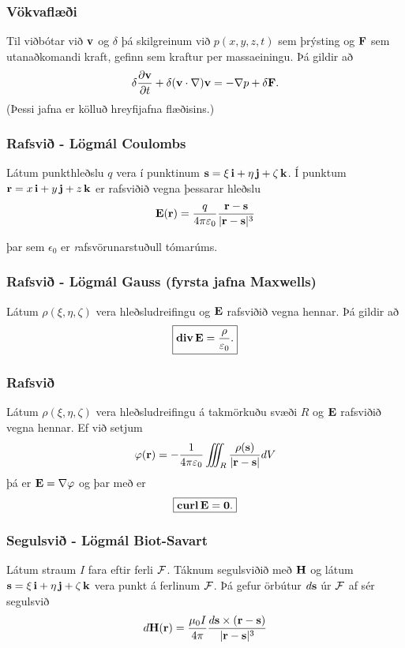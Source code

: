 \subsubsection{Vökvaflæði \rtask{}}
 Til viðbótar við $\mbox{${\bf v}$}$ og $\delta$ þá skilgreinum við $p(x,y,z,t)$ sem þrýsting og $\mbox{${\bf F}$}$ sem utanaðkomandi kraft, gefinn sem kraftur per massaeiningu.  Þá gildir að $$\delta\frac{\partial \mbox{${\bf v}$}}{\partial t}+\delta(\mbox{${\bf v}$}\cdot\nabla)\mbox{${\bf v}$}=-\nabla p+\delta\mbox{${\bf F}$}.$$
(Þessi jafna er kölluð hreyfijafna flæðisins.)


\subsubsection{Rafsvið \rtask{} - Lögmál Coulombs }
 Látum punkthleðslu $q$ vera í punktinum $\mbox{${\bf s}$}=\xi\,\mbox{${\bf i}$}+\eta\,\mbox{${\bf j}$}+\zeta\,\mbox{${\bf k}$}$.   Í punktum $\mbox{${\bf r}$}=x\,\mbox{${\bf i}$}+y\,\mbox{${\bf j}$}+z\,\mbox{${\bf k}$}$ er rafsviðið vegna þessarar hleðslu
$$\mbox{${\bf E}$}(\mbox{${\bf r}$})=\frac{q}{4\pi\varepsilon_0}\frac{\mbox{${\bf r}$}-\mbox{${\bf s}$}}{|\mbox{${\bf r}$}-\mbox{${\bf s}$}|^3}$$

þar sem $\epsilon_0$ er {\emph rafsvörunarstuðull} tómarúms.



\subsubsection{Rafsvið  \rtask{} - Lögmál Gauss (fyrsta jafna Maxwells)}
 Látum $\rho(\xi,\eta,\zeta)$ vera hleðsludreifingu og $\mbox{${\bf E}$}$ rafsviðið vegna hennar.  Þá gildir að 
$$\boxed{\mbox{${\rm\bf div\,}$}\mbox{${\bf E}$}=\frac{\rho}{\varepsilon_0}.}$$

\subsubsection{Rafsvið \rtask{}}
 Látum $\rho(\xi,\eta,\zeta)$ vera hleðsludreifingu á takmörkuðu svæði $R$ og $\mbox{${\bf E}$}$ rafsviðið vegna hennar.  Ef við setjum
 $$ \varphi(\mbox{${\bf r}$}) = -\frac{1}{4 \pi \varepsilon_0} \iiint_R \frac{\rho(\mbox{${\bf s}$})}{|\mbox{${\bf r}$}-\mbox{${\bf s}$}|} dV$$
 þá er $\mbox{${\bf E}$} = \nabla \varphi$ og þar með er 
$$\boxed{\mbox{${\rm\bf curl\,}$} \mbox{${\bf E}$}= \mathbf{0}.}$$


 

\subsubsection{Segulsvið \rtask{} - Lögmál Biot-Savart }
 Látum straum $I$ fara eftir ferli $\cal F$.  Táknum segulsviðið með $\mbox{${\bf H}$}$ og látum $\mbox{${\bf s}$}=\xi\,\mbox{${\bf i}$}+\eta\,\mbox{${\bf j}$}+\zeta\,\mbox{${\bf k}$}$ vera punkt á ferlinum $\cal F$.  Þá gefur örbútur $d\mbox{${\bf s}$}$ úr $\cal F$ af sér segulsvið 
$$d\mbox{${\bf H}$}(\mbox{${\bf r}$})=\frac{\mu_0 I}{4\pi}\frac{d\mbox{${\bf s}$}\times(\mbox{${\bf r}$}-\mbox{${\bf s}$})}{|\mbox{${\bf r}$}-\mbox{${\bf s}$}|^3}$$

